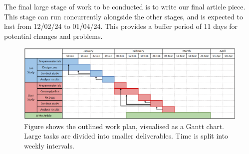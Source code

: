 \documentclass{interim}
\begin{document}
The final large stage of work to be conducted is to write our final article piece. This stage can run concurrently alongside the other stages, and is expected to last from 12/02/24 to 01/04/24. This provides a buffer period of 11 days for potential changes and problems.

\begin{figure}[!ht]
    \centering
    \includegraphics[width=1\textwidth]{images/work-plan.pdf}
    \caption{Figure shows the outlined work plan, visualised as a Gantt chart. Large tasks are divided into smaller deliverables. Time is split into weekly intervals.}
    \label{fig:work-plan}
\end{figure}




\end{document}
